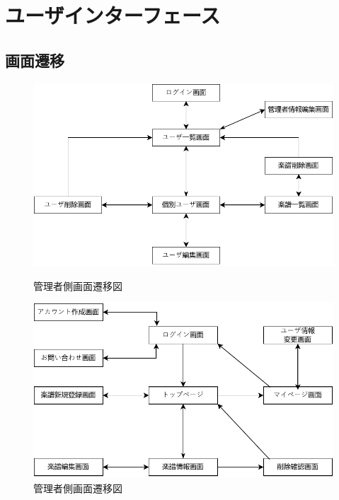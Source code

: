 \chapter{ユーザインターフェース}
\section{画面遷移}
\begin{figure}[H]
    \centering
    \begin{minipage}[b]{.45\textwidth}
        \centering
        \begin{framed}
            \includegraphics[keepaspectratio,width=\textwidth]{ui/管理者側画面遷移図.pdf}
        \end{framed}
        \caption{管理者側画面遷移図}
    \end{minipage}
    \begin{minipage}[b]{.45\textwidth}
        \centering
        \begin{framed}
            \vspace{.2cm}
            \includegraphics[keepaspectratio,width=\textwidth]{ui/ユーザ側画面遷移図.pdf}
        \end{framed}
        \caption{管理者側画面遷移図}
    \end{minipage}
\end{figure}
